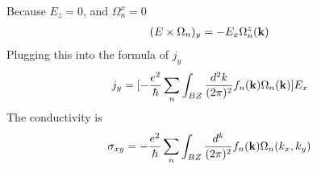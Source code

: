 \documentclass[a4paper]{article}
\begin{document}
Because $E_z = 0$, and $\Omega_n^x=0$
\begin{align*}
(E \times \Omega_n)_y = - E_x \Omega_n^z({\bf k})
\end{align*}
Plugging this into the formula of $j_y$
\begin{align*}
j_y = [-\frac{e^2}{\hbar}\sum_n \int_{BZ} \frac{d^2 k}{(2\pi)^2}f_n({\bf k})\Omega_n({\bf k})]E_x
\end{align*}
The conductivity is
\begin{align*}
\sigma_{xy} =-\frac{e^2}{\hbar}\sum_n \int_{BZ} \frac{d^k}{(2\pi)^2}f_n({\bf k})\Omega_n(k_x, k_y)
\end{align*}
\end{document}
